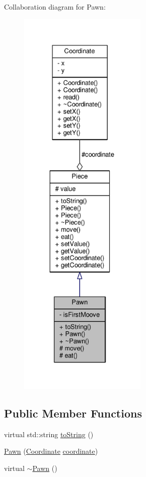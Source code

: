 Collaboration diagram for Pawn\+:
\nopagebreak
\begin{figure}[H]
\begin{center}
\leavevmode
\includegraphics[height=550pt]{class_pawn__coll__graph}
\end{center}
\end{figure}
\subsection*{Public Member Functions}
\begin{DoxyCompactItemize}
\item 
virtual std\+::string \hyperlink{class_pawn_afac4abaf92106777e20d21fde635ffc4}{to\+String} ()
\item 
\hyperlink{class_pawn_a28054ee4fa72e69892be4d250191aa22}{Pawn} (\hyperlink{class_coordinate}{Coordinate} \hyperlink{class_piece_a9e92373c8fffc1f5efb20d62204b70cf}{coordinate})
\item 
virtual \hyperlink{class_pawn_a3095938fb8326469c3bd05da0b8f50af}{$\sim$\+Pawn} ()
\end{DoxyCompactItemize}
